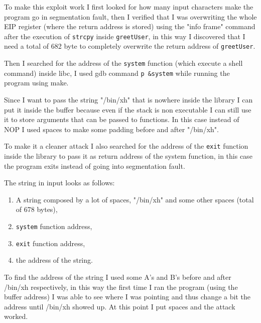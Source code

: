 \documentclass[a4paper,12pt]{article}
\begin{document}
To make this exploit work I first looked for how many input characters make the program go in segmentation fault, then I verified that I was overwriting the whole EIP register (where the return address is stored) using the "info frame" command after the execution of \texttt{strcpy} inside \texttt{greetUser}, in this way I discovered that I need a total of 682 byte to completely overwrite the return address of \texttt{greetUser}.

Then I searched for the address of the \texttt{system} function (which execute a shell command) inside libc, I used gdb command \texttt{p \&system} while running the program using make.

Since I want to pass the string "/bin/xh" that is nowhere inside the library I can put it inside the buffer because even if the stack is non executable I can still use it to store arguments that can be passed to functions. In this case instead of NOP I used spaces to make some padding before and after "/bin/xh".

To make it a cleaner attack I also searched for the address of the \texttt{exit} function inside the library to pass it as return address of the system function, in this case the program exits instead of going into segmentation fault.

The string in input looks as follows:
\begin{enumerate}
\item A string composed by a lot of spaces, "/bin/xh" and some other spaces (total of 678 bytes),
\item \texttt{system} function address,
\item \texttt{exit} function address,
\item the address of the string.
\end{enumerate}

To find the address of the string I used some A's and B's before and after /bin/xh respectively, in this way the first time I ran the program (using the buffer address) I was able to see where I was pointing and thus change a bit the address until /bin/xh showed up. At this point I put spaces and the attack worked.




\end{document}
